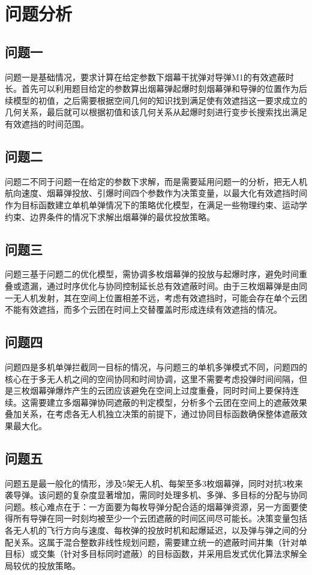 \documentclass{ctexart}
\begin{document}
\section{问题分析}
\subsection{问题一}
问题一是基础情况，要求计算在给定参数下烟幕干扰弹对导弹M1的有效遮蔽时长。首先可以利用题目给定的参数算出烟幕弹起爆时刻烟幕弹和导弹的位置作为后续模型的初值，之后需要根据空间几何的知识找到满足使有效遮挡这一要求成立的几何关系，最后就可以根据初值和该几何关系从起爆时刻进行变步长搜索找出满足有效遮挡的时间范围。
\subsection{问题二}
问题二不同于问题一在给定的参数下求解，而是需要延用问题一的分析，把无人机航向速度、烟幕弹投放、引爆时间四个参数作为决策变量，以最大化有效遮挡时间作为目标函数建立单机单弹情况下的策略优化模型，在满足一些物理约束、运动学约束、边界条件的情况下求解出烟幕弹的最优投放策略。
\subsection{问题三}
问题三基于问题二的优化模型，需协调多枚烟幕弹的投放与起爆时序，避免时间重叠或遗漏，通过时序优化与协同控制延长总有效遮蔽时间。由于三枚烟幕弹是由同一无人机发射，其在空间上位置相差不远，考虑有效遮挡时，可能会存在单个云团不能有效遮挡，而多个云团在时间上交替覆盖时形成连续有效遮挡的情况。
\subsection{问题四}
问题四是多机单弹拦截同一目标的情况，与问题三的单机多弹模式不同，问题四的核心在于多无人机之间的空间协同和时间协调，这里不需要考虑投弹时间间隔，但是三枚烟幕弹爆炸产生的云团应该避免在空间上过度重叠，同时时间上要保持连续。这需要建立多烟幕弹协同遮蔽的判定模型，分析多个云团在空间上的遮蔽效果叠加关系，在考虑各无人机独立决策的前提下，通过协同目标函数确保整体遮蔽效果最大化。
\subsection{问题五}
问题五是最一般化的情形，涉及5架无人机、每架至多3枚烟幕弹，同时对抗3枚来袭导弹。该问题的复杂度显著增加，需同时处理多机、多弹、多目标的分配与协同问题。核心难点在于：一方面要为每枚导弹分配合适的烟幕弹资源，另一方面要使得所有导弹在同一时刻均被至少一个云团遮蔽的时间区间尽可能长。决策变量包括各无人机的飞行方向与速度、每枚弹的投放时机和起爆延迟，以及弹与弹之间的分配关系。这属于混合整数非线性规划问题，需要建立统一的遮蔽时间并集（针对单目标）或交集（针对多目标同时遮蔽）的目标函数，并采用启发式优化算法求解全局较优的投放策略。
\end{document}
